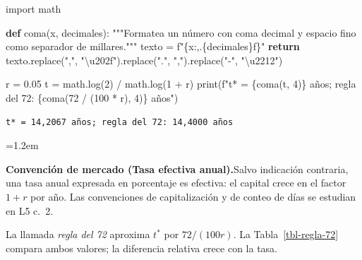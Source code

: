 \documentclass[
  spanish,
  letterpaper,
  a4paper,
  11pt,
  oneside,
  numbers=noenddot]{scrbook}
\newenvironment{Shaded}{\begin{snugshade}}{\end{snugshade}}
\newcommand{\BuiltInTok}[1]{\textcolor[rgb]{0.00,0.23,0.31}{#1}}
\newcommand{\CharTok}[1]{\textcolor[rgb]{0.13,0.47,0.30}{#1}}
\newcommand{\CommentTok}[1]{\textcolor[rgb]{0.37,0.37,0.37}{#1}}
\newcommand{\ControlFlowTok}[1]{\textcolor[rgb]{0.00,0.23,0.31}{\textbf{#1}}}
\newcommand{\DecValTok}[1]{\textcolor[rgb]{0.68,0.00,0.00}{#1}}
\newcommand{\FloatTok}[1]{\textcolor[rgb]{0.68,0.00,0.00}{#1}}
\newcommand{\ImportTok}[1]{\textcolor[rgb]{0.00,0.46,0.62}{#1}}
\newcommand{\KeywordTok}[1]{\textcolor[rgb]{0.00,0.23,0.31}{\textbf{#1}}}
\newcommand{\NormalTok}[1]{\textcolor[rgb]{0.00,0.23,0.31}{#1}}
\newcommand{\OperatorTok}[1]{\textcolor[rgb]{0.37,0.37,0.37}{#1}}
\newcommand{\SpecialCharTok}[1]{\textcolor[rgb]{0.37,0.37,0.37}{#1}}
\newcommand{\SpecialStringTok}[1]{\textcolor[rgb]{0.13,0.47,0.30}{#1}}
\newcommand{\StringTok}[1]{\textcolor[rgb]{0.13,0.47,0.30}{#1}}
\newenvironment{atlasnota}{\par\medskip\begin{list}{}{\leftmargin=1.2em\rightmargin=0pt}\item\relax}{\end{list}\medskip}
\newcommand{\atlasnotatitulo}[1]{\textbf{#1.}\enspace}
\theoremstyle{definition}
\theoremstyle{plain}
\theoremstyle{definition}
\theoremstyle{definition}
\theoremstyle{plain}
\theoremstyle{remark}
\begin{document}
\protect{}\label{duplicacion}
\begin{Shaded}
\begin{Highlighting}[]
\ImportTok{import}\NormalTok{ math}

\KeywordTok{def}\NormalTok{ coma(x, decimales):}
    \CommentTok{"""Formatea un número con coma decimal y espacio fino como separador de millares."""}
\NormalTok{    texto }\OperatorTok{=} \SpecialStringTok{f"}\SpecialCharTok{\{}\NormalTok{x}\SpecialCharTok{:,.}\NormalTok{\{decimales\}f}\SpecialCharTok{\}}\SpecialStringTok{"}
    \ControlFlowTok{return}\NormalTok{ texto.replace(}\StringTok{","}\NormalTok{, }\StringTok{"}\CharTok{\textbackslash{}u202f}\StringTok{"}\NormalTok{).replace(}\StringTok{"."}\NormalTok{, }\StringTok{","}\NormalTok{).replace(}\StringTok{"{-}"}\NormalTok{, }\StringTok{"}\CharTok{\textbackslash{}u2212}\StringTok{"}\NormalTok{)}

\NormalTok{r }\OperatorTok{=} \FloatTok{0.05}
\NormalTok{t }\OperatorTok{=}\NormalTok{ math.log(}\DecValTok{2}\NormalTok{) }\OperatorTok{/}\NormalTok{ math.log(}\DecValTok{1} \OperatorTok{+}\NormalTok{ r)}
\BuiltInTok{print}\NormalTok{(}\SpecialStringTok{f"t* = }\SpecialCharTok{\{}\NormalTok{coma(t, }\DecValTok{4}\NormalTok{)}\SpecialCharTok{\}}\SpecialStringTok{ años; regla del 72: }\SpecialCharTok{\{}\NormalTok{coma(}\DecValTok{72} \OperatorTok{/}\NormalTok{ (}\DecValTok{100} \OperatorTok{*}\NormalTok{ r), }\DecValTok{4}\NormalTok{)}\SpecialCharTok{\}}\SpecialStringTok{ años"}\NormalTok{)}
\end{Highlighting}
\end{Shaded}

\begin{verbatim}
t* = 14,2067 años; regla del 72: 14,4000 años
\end{verbatim}

\begin{atlasnota}

\atlasnotatitulo{Convención de mercado (\mdseries Tasa efectiva anual)}Salvo
indicación contraria, una tasa anual expresada en porcentaje es
efectiva: el capital crece en el factor \(1 + r\) por año. Las
convenciones de capitalización y de conteo de días se estudian en L5
c.~2.

\end{atlasnota}

La llamada \emph{regla del 72} aproxima \(t^{*}\) por \(72 / (100 r)\).
La Tabla~\ref{tbl-regla-72} compara ambos valores; la diferencia
relativa crece con la tasa.
\end{document}
